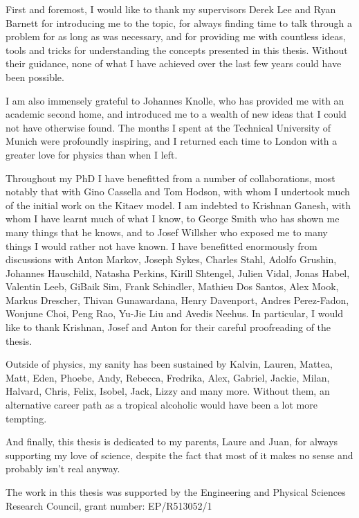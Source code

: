 \begin{acknowledgements}

    First and foremost, I would like to thank my supervisors Derek Lee and Ryan Barnett for introducing me to the topic, for always finding time to talk through a problem for as long as was necessary, and for providing me with countless ideas, tools and tricks for understanding the concepts presented in this thesis. Without their guidance, none of what I have achieved over the last few years could have been possible. 

    I am also immensely grateful to Johannes Knolle, who has provided me with an academic second home, and introduced me to a wealth of new ideas that I could not have otherwise found.     
    The months I spent at the Technical University of Munich were profoundly inspiring, and I returned each time to London with a greater love for physics than when I left. 

    Throughout my PhD I have benefitted from a number of collaborations, most notably that with Gino Cassella and Tom Hodson, with whom I undertook much of the initial work on the Kitaev model. I am indebted to Krishnan Ganesh, with whom I have learnt much of what I know, to George Smith who has shown me many things that he knows, and to Josef Willsher who exposed me to many things I would rather not have known. I have benefitted enormously from discussions with Anton Markov, Joseph Sykes, Charles Stahl, Adolfo Grushin, Johannes Hauschild, Natasha Perkins, Kirill Shtengel, Julien Vidal, Jonas Habel, Valentin Leeb, GiBaik Sim, Frank Schindler, Mathieu Dos Santos, Alex Mook, Markus Drescher, Thivan Gunawardana, Henry Davenport, Andres Perez-Fadon, Wonjune Choi, Peng Rao, Yu-Jie Liu and Avedis Neehus. In particular, I would like to thank Krishnan, Josef and Anton for their careful proofreading of the thesis.

    Outside of physics, my sanity has been sustained by Kalvin, Lauren, Mattea, Matt, Eden, Phoebe, Andy, Rebecca, Fredrika, Alex, Gabriel, Jackie, Milan, Halvard, Chris, Felix, Isobel, Jack, Lizzy and many more. Without them, an alternative career path as a tropical alcoholic would have been a lot more tempting. 

    And finally, this thesis is dedicated to my parents, Laure and Juan, for always supporting my love of science, despite the fact that most of it makes no sense and probably isn't real anyway.

    The work in this thesis was supported by the Engineering and Physical Sciences Research Council, grant number: EP/R513052/1

\end{acknowledgements}